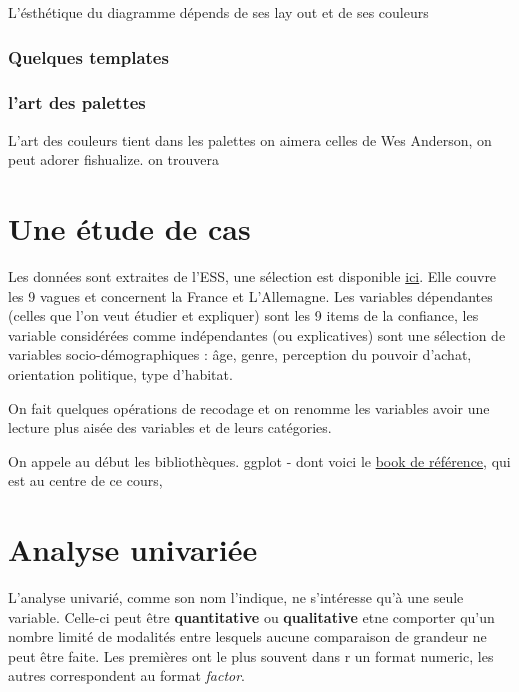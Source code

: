 \documentclass[
]{book}
\begin{document}
L'ésthétique du diagramme dépends de ses lay out et de ses couleurs

\hypertarget{quelques-templates}{%
\subsubsection{Quelques templates}\label{quelques-templates}}

\hypertarget{lart-des-palettes}{%
\subsubsection{l'art des palettes}\label{lart-des-palettes}}

L'art des couleurs tient dans les palettes on aimera celles de Wes Anderson, on peut adorer fishualize. on trouvera

\hypertarget{une-uxe9tude-de-cas}{%
\section{Une étude de cas}\label{une-uxe9tude-de-cas}}

Les données sont extraites de l'ESS, une sélection est disponible \href{}{ici}. Elle couvre les 9 vagues et concernent la France et L'Allemagne. Les variables dépendantes (celles que l'on veut étudier et expliquer) sont les 9 items de la confiance, les variable considérées comme indépendantes (ou explicatives) sont une sélection de variables socio-démographiques : âge, genre, perception du pouvoir d'achat, orientation politique, type d'habitat.

On fait quelques opérations de recodage et on renomme les variables avoir une lecture plus aisée des variables et de leurs catégories.

On appele au début les bibliothèques. ggplot - dont voici le \href{https://ggplot2-book.org/}{book de référence}, qui est au centre de ce cours,

\hypertarget{analyse-univariuxe9e}{%
\section{Analyse univariée}\label{analyse-univariuxe9e}}

L'analyse univarié, comme son nom l'indique, ne s'intéresse qu'à une seule variable. Celle-ci peut être \textbf{quantitative} ou \textbf{qualitative} etne comporter qu'un nombre limité de modalités entre lesquels aucune comparaison de grandeur ne peut être faite. Les premières ont le plus souvent dans r un format numeric, les autres correspondent au format \emph{factor}.
\end{document}
